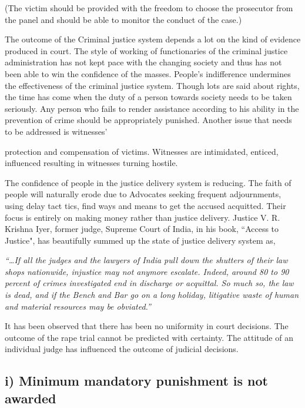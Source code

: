 \begin{multicols}{2}
\noi
(The victim should be provided with the freedom to choose the prosecutor from the
panel and should be able to monitor the conduct of the case.)

\noi
The outcome of the Criminal justice system depends a lot on the kind of evidence
produced in court. The style of working of functionaries of the criminal justice
administration has not kept pace with the changing society and thus has not been able
to win the confidence of the masses. People's indifference undermines the effectiveness
of the criminal justice system. Though lots are said about rights, the time has come
when the duty of a person towards society needs to be taken seriously. Any person who
fails to render assistance according to his ability in the prevention of crime should be
appropriately punished. Another issue that needs to be addressed is witnesses'

\noi
protection and compensation of victims. Witnesses are intimidated, enticed, influenced
resulting in witnesses turning hostile.

\noi
The confidence of people in the justice delivery system is reducing. The faith of people
will naturally erode due to Advocates seeking frequent adjournments, using delay tact
tics, find ways and means to get the accused acquitted. Their focus is entirely on making
money rather than justice delivery. Justice V. R. Krishna Iyer, former judge, Supreme
Court of India, in his book, “Access to Justice", has beautifully summed up the state of
justice delivery system as,

\noi
\textit{“…If all the judges and the lawyers of India pull down the shutters of their law shops
nationwide, injustice may not anymore escalate. Indeed, around 80 to 90 percent of
crimes investigated end in discharge or acquittal. So much so, the law is dead, and if
the Bench and Bar go on a long holiday, litigative waste of human and material
resources may be obviated.”}


\noi
It has been observed that there has been no uniformity in court decisions. The outcome
of the rape trial cannot be predicted with certainty. The attitude of an individual judge
has influenced the outcome of judicial decisions.

\vspace{-.4cm}

\subsection*{i) Minimum mandatory punishment is not awarded}


\end{multicols}
